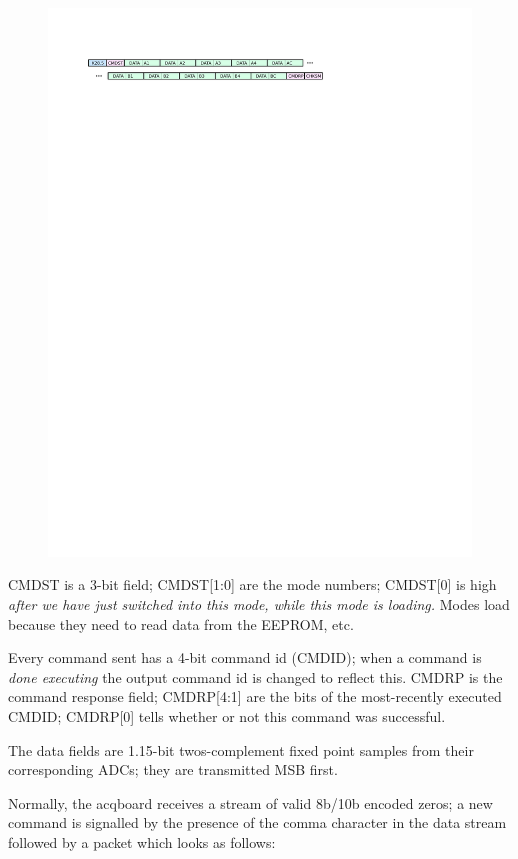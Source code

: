 \begin{figure}[h!]
\includegraphics[width=6in]{txpacket}
\end{figure}

CMDST is a 3-bit field; CMDST[1:0] are the mode numbers; CMDST[0] is high \textit{after we have just switched into this mode, while this mode is loading.} Modes load because they need to read data from the EEPROM, etc. 

Every command sent has a 4-bit command id (CMDID); when a command is \textit{done executing} the output command id is changed to reflect this. CMDRP is the command response field; CMDRP[4:1] are the bits of the most-recently executed CMDID; CMDRP[0] tells whether or not this command was successful. 

The data fields are 1.15-bit twos-complement fixed point samples from their corresponding ADCs; they are transmitted MSB first. 

Normally, the acqboard receives a stream of valid 8b/10b encoded zeros; a new command is signalled by the presence of the comma character in the data stream followed by a packet which looks as follows:

